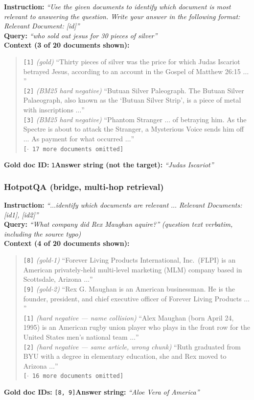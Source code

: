 \textbf{Instruction:} \emph{``Use the given documents to identify which document is most relevant to
answering the question. Write your answer in the following format: Relevant Document: [id]''}\\
\textbf{Query:} \emph{``who sold out jesus for 30 pieces of silver''}\\
\textbf{Context (3 of 20 documents shown):}
\begin{quote}\small
\texttt{[1]} \emph{(gold)} ``Thirty pieces of silver was the price for which Judas Iscariot betrayed
Jesus, according to an account in the Gospel of Matthew 26:15 $\dots$''\\
\texttt{[2]} \emph{(BM25 hard negative)} ``Butuan Silver Paleograph. The Butuan Silver Palaeograph,
also known as the `Butuan Silver Strip', is a piece of metal with inscriptions $\dots$''\\
\texttt{[3]} \emph{(BM25 hard negative)} ``Phantom Stranger $\dots$ of betraying him. As the Spectre
is about to attack the Stranger, a Mysterious Voice sends him off $\dots$ As payment for what
occurred $\dots$''\\
\texttt{[$\cdot$ 17 more documents omitted]}
\end{quote}
\textbf{Gold doc ID:} \texttt{1}\quad\textbf{Answer string (not the target):} \emph{``Judas Iscariot''}

\subsubsection{HotpotQA (bridge, multi-hop retrieval)}

\textbf{Instruction:} \emph{``$\dots$identify which documents are relevant $\dots$ Relevant
Documents: [id1], [id2]''}\\
\textbf{Query:} \emph{``What company did Rex Maughan aquire?''} \emph{(question text verbatim,
including the source typo)}\\
\textbf{Context (4 of 20 documents shown):}
\begin{quote}\small
\texttt{[8]} \emph{(gold-1)} ``Forever Living Products International, Inc.\ (FLPI) is an American
privately-held multi-level marketing (MLM) company based in Scottsdale, Arizona $\dots$''\\
\texttt{[9]} \emph{(gold-2)} ``Rex G. Maughan is an American businessman. He is the founder,
president, and chief executive officer of Forever Living Products $\dots$''\\
\texttt{[1]} \emph{(hard negative --- name collision)} ``Alex Maughan (born April 24, 1995) is an
American rugby union player who plays in the front row for the United States men's national team
$\dots$''\\
\texttt{[2]} \emph{(hard negative --- same article, wrong chunk)} ``Ruth graduated from BYU with a
degree in elementary education, she and Rex moved to Arizona $\dots$''\\
\texttt{[$\cdot$ 16 more documents omitted]}
\end{quote}
\textbf{Gold doc IDs:} \texttt{[8, 9]}\quad\textbf{Answer string:} \emph{``Aloe Vera of America''}

